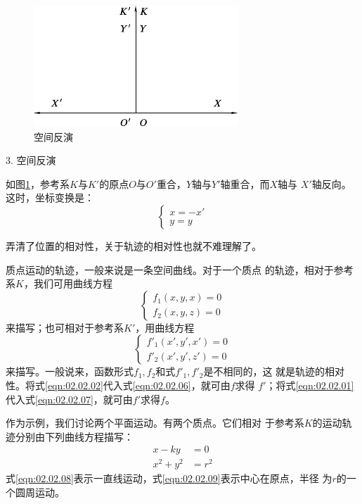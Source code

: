 \begin{figure}
  \centering
  \includegraphics{figure/fig02.04}
  \caption{空间反演}
  \label{fig:02.04}
\end{figure}
\textsf{3. 空间反演}

如图\ref{fig:02.04}，参考系$K$与$K'$的原点$O$与$O'$重合，$Y$轴与$Y'$轴重合，而$X$轴与
$X'$轴反向。这时，坐标变换是：
{\setlength{\mathindent}{2em}
\begin{equation}\label{eqn:02.02.05}
  \left\{\begin{array}{l}
    x=-x' \\
    y=y
  \end{array}\right.
\end{equation}}%

弄清了位置的相对性，关于轨迹的相对性也就不难理解了。

质点运动的轨迹，一般来说是一条空间曲线。对于一个质点
的轨迹，相对于参考系$ K $，我们可用曲线方程
\begin{equation}\label{eqn:02.02.06}
  \left\{\begin{array}{l}
    f_1\left(x,y,x\right)=0 \\
    f_2\left(x,y,z\right)=0
  \end{array}\right.
\end{equation}
来描写；也可相对于参考系$K'$，用曲线方程
\clearpage
\begin{equation}\label{eqn:02.02.07}
  \left\{\begin{array}{l}
    f'_1\left(x',y',x'\right)=0 \\
    f'_2\left(x',y',z'\right)=0
  \end{array}\right.
\end{equation}
来描写。一般说来，函数形式$f_1,f_2$和式$f'_1,f'_2$是不相同的，这
就是轨迹的相对性。将式\eqref{eqn:02.02.02}代入式\eqref{eqn:02.02.06}，就可由$f$求得
$f'$；将式\eqref{eqn:02.02.01}代入式\eqref{eqn:02.02.07}，就可由$f'$求得$f$。

作为示例，我们讨论两个平面运动。有两个质点。它们相对
于参考系$K$的运动轨迹分别由下列曲线方程描写：
\begin{align}
  x-ky    & =0 \label{eqn:02.02.08}   \\
  x^2+y^2 & =r^2 \label{eqn:02.02.09}
\end{align}
式\eqref{eqn:02.02.08}表示一直线运动，式\eqref{eqn:02.02.09}表示中心在原点，半径
为$r$的一个圆周运动。

